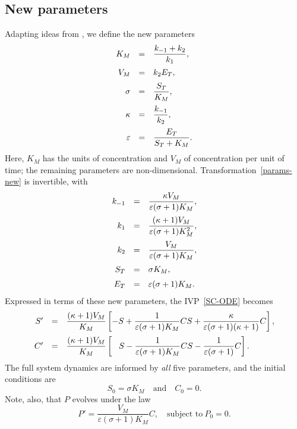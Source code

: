 \documentclass{article}
\newcommand{\eps}{\varepsilon}
\newcommand{\be}{\begin{equation}}
\newcommand{\ee}{\end{equation}}
\newcommand{\dst}{\displaystyle}
\begin{document}
\subsection{New parameters}
%
Adapting ideas from \cite{SS89},
we define the new parameters
%
\be
\begin{array}{rclcl}
 K_M &=& \dst\frac{k_{-1} + k_2}{k_1} ,
\vspace{2mm}\\
 V_M &=& k_2 E_T ,
\vspace{2mm}\\
 \sigma &=& \dst\frac{S_T}{K_M} ,
\vspace{2mm}\\
 \kappa &=& \dst\frac{k_{-1}}{k_2} ,
\vspace{2mm}\\
 \eps &=& \dst\frac{E_T}{S_T + K_M} .
\end{array}
\label{params-new}
\ee
%
Here, $K_M$ has the units of concentration
and $V_M$ of concentration per unit of time;
the remaining parameters are non-dimensional.
Transformation~\eqref{params-new} is invertible, with
%
\be
\begin{array}{rclcl}
 k_{-1} &=& \dst\frac{\kappa V_M}{\eps (\sigma+1) K_M} ,
\vspace{2mm}\\
 k_1 &=& \dst\frac{(\kappa+1) V_M}{\eps (\sigma+1) K_M^2} ,
\vspace{2mm}\\
 k_2 &=& \dst\frac{V_M}{\eps (\sigma+1) K_M} ,
\vspace{2mm}\\
 S_T &=& \dst\sigma K_M ,
\vspace{2mm}\\
 E_T &=& \dst\eps (\sigma+1) K_M .
\end{array}
\label{params-old}
\ee
%
Expressed in terms of these new parameters,
the IVP~\eqref{SC-ODE} becomes
%
\be
\begin{array}{rclcl}
 S'
&=&
\dst
 \frac{(\kappa+1)V_M}{K_M}
\left[
 -S
+
 \frac{1}{\eps(\sigma+1)K_M} C S
+
 \frac{\kappa}{\eps(\sigma+1)(\kappa+1)} C
\right] ,
\vspace{2mm}\\
 C'
&=&
\dst
 \frac{(\kappa+1)V_M}{K_M}
\left[
\ \ \,
 S
-
 \frac{1}{\eps(\sigma+1)K_M} C S
-
 \frac{1}{\eps(\sigma+1)} C
\right] .
\end{array}
\label{SC-ODE-new}
\ee
%
The full system dynamics are informed
by \textit{all} five parameters,
and the initial conditions are
%
\be
 S_0 = \sigma K_M
\quad\mbox{and}\quad
 C_0 = 0 .
\label{SC-IC-new}
\ee
%
Note, also, that $P$ evolves under the law
%
\be
 P' = \frac{V_M}{\eps (\sigma+1) K_M} C ,
\quad\mbox{subject to}\
 P_0 = 0 .
\label{P-IVP-new}
\ee
%
\end{document}

